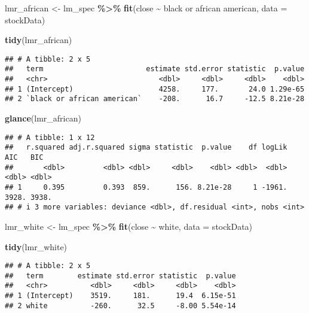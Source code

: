 \documentclass[
]{article}
\newenvironment{Shaded}{\begin{snugshade}}{\end{snugshade}}
\newcommand{\AttributeTok}[1]{\textcolor[rgb]{0.13,0.29,0.53}{#1}}
\newcommand{\FunctionTok}[1]{\textcolor[rgb]{0.13,0.29,0.53}{\textbf{#1}}}
\newcommand{\NormalTok}[1]{#1}
\newcommand{\OtherTok}[1]{\textcolor[rgb]{0.56,0.35,0.01}{#1}}
\newcommand{\SpecialCharTok}[1]{\textcolor[rgb]{0.81,0.36,0.00}{\textbf{#1}}}
\newcommand{\StringTok}[1]{\textcolor[rgb]{0.31,0.60,0.02}{#1}}
\begin{document}
\begin{Shaded}
\begin{Highlighting}[]
\NormalTok{lmr\_african }\OtherTok{\textless{}{-}}\NormalTok{ lm\_spec }\SpecialCharTok{\%\textgreater{}\%} 
  \FunctionTok{fit}\NormalTok{(close }\SpecialCharTok{\textasciitilde{}} \StringTok{\textasciigrave{}}\AttributeTok{black or african american}\StringTok{\textasciigrave{}}\NormalTok{, }\AttributeTok{data =}\NormalTok{ stockData)}

\FunctionTok{tidy}\NormalTok{(lmr\_african)}
\end{Highlighting}
\end{Shaded}

\begin{verbatim}
## # A tibble: 2 x 5
##   term                        estimate std.error statistic  p.value
##   <chr>                          <dbl>     <dbl>     <dbl>    <dbl>
## 1 (Intercept)                    4258.     177.       24.0 1.29e-65
## 2 `black or african american`    -208.      16.7     -12.5 8.21e-28
\end{verbatim}

\begin{Shaded}
\begin{Highlighting}[]
\FunctionTok{glance}\NormalTok{(lmr\_african)}
\end{Highlighting}
\end{Shaded}

\begin{verbatim}
## # A tibble: 1 x 12
##   r.squared adj.r.squared sigma statistic  p.value    df logLik   AIC   BIC
##       <dbl>         <dbl> <dbl>     <dbl>    <dbl> <dbl>  <dbl> <dbl> <dbl>
## 1     0.395         0.393  859.      156. 8.21e-28     1 -1961. 3928. 3938.
## # i 3 more variables: deviance <dbl>, df.residual <int>, nobs <int>
\end{verbatim}

\begin{Shaded}
\begin{Highlighting}[]
\NormalTok{lmr\_white }\OtherTok{\textless{}{-}}\NormalTok{ lm\_spec }\SpecialCharTok{\%\textgreater{}\%} 
  \FunctionTok{fit}\NormalTok{(close }\SpecialCharTok{\textasciitilde{}}\NormalTok{ white, }\AttributeTok{data =}\NormalTok{ stockData)}

\FunctionTok{tidy}\NormalTok{(lmr\_white)}
\end{Highlighting}
\end{Shaded}

\begin{verbatim}
## # A tibble: 2 x 5
##   term        estimate std.error statistic  p.value
##   <chr>          <dbl>     <dbl>     <dbl>    <dbl>
## 1 (Intercept)    3519.     181.      19.4  6.15e-51
## 2 white          -260.      32.5     -8.00 5.54e-14
\end{verbatim}
\end{document}
